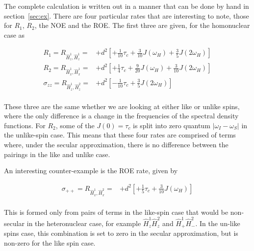 \documentclass[notitlepage,11pt]{article}
\begin{document}
The complete calculation is written out in a manner that can be done by hand in section~\ref{sec:ex}. There are four particular rates that are interesting to note, those for $R_1$, $R_2$, the NOE and the ROE. The first three are given, for the homonuclear case as

\begin{small}
  \begin{equation}\begin{array}{rl}
R_1= R_{\hat{H}^1_z,\hat{H}^1_z} =
& + d^2 \left[ +\frac{1}{10} \tau_c +\frac{3}{10} J\left(\omega_H\right) +\frac{3}{5} J\left(2\omega_H\right)\right]\\
R_2=R_{\hat{H}^1_x,\hat{H}^1_x}=
& + d^2 \left[ +\frac{1}{4} \tau_c +\frac{9}{20} J\left(\omega_H\right) +\frac{3}{10} J\left(2\omega_H\right)\right]\\
\sigma_{zz}= R_{\hat{H}^1_z,\hat{H}^2_z}=
& + d^2 \left[ -\frac{1}{10} \tau_c +\frac{3}{5} J\left(2\omega_H\right)\right]\\
\end{array}\end{equation}
\end{small}

These three are the same whether we are looking at either like or unlike spins, where the only difference is a change in the frequencies of the spectral density functions. For $R_2$, some of the $J(0)=\tau_c$ is split into zero quantum $|\omega_I-\omega_S|$ in the unlike-spin case. This means that these four rates are comprised of terms where, under the secular approximation, there is no difference between the pairings in the like and unlike case.

An interesting counter-example is the ROE rate, given by

\begin{small}
\begin{equation}\begin{array}{rl}
    \sigma_{++}= R_{\hat{H}^1_x,\hat{H}^2_x}=
& + d^2 \left[ +\frac{1}{5} \tau_c +\frac{3}{10} J\left(\omega_H\right)\right]\\
\end{array}\end{equation}
\end{small}

This is formed only from pairs of terms in the like-spin case that would be non-secular in the heteronuclear case, for example $\hat{H}^1_z\hat{H}^2_z$ and $\hat{H}^1_+\hat{H}^2_-$. In the un-like spins case, this combination is set to zero in the secular approximation, but is non-zero for the like spin case.
\end{document}
